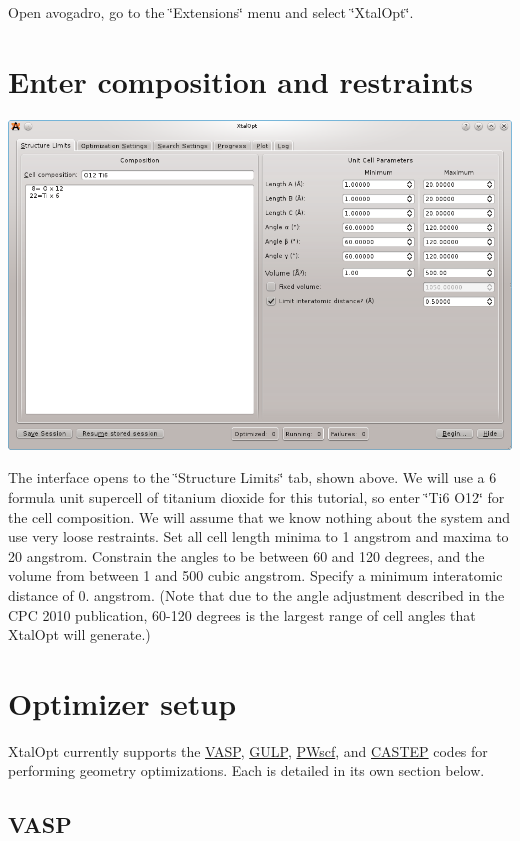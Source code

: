Open avogadro, go to the \char`\"{}\+Extensions\char`\"{} menu and select \char`\"{}\+Xtal\+Opt\char`\"{}.\hypertarget{tut-xo_init}{}\section{Enter composition and restraints}\label{tut-xo_init}
 
\begin{DoxyImageNoCaption}
  \mbox{\includegraphics[width=\textwidth]{struct-lim.png}}
\end{DoxyImageNoCaption}


The interface opens to the \char`\"{}\+Structure Limits\char`\"{} tab, shown above. We will use a 6 formula unit supercell of titanium dioxide for this tutorial, so enter \char`\"{}\+Ti6 O12\char`\"{} for the cell composition. We will assume that we know nothing about the system and use very loose restraints. Set all cell length minima to 1 angstrom and maxima to 20 angstrom. Constrain the angles to be between 60 and 120 degrees, and the volume from between 1 and 500 cubic angstrom. Specify a minimum interatomic distance of 0. angstrom. (Note that due to the angle adjustment described in the C\+P\+C 2010 publication, 60-\/120 degrees is the largest range of cell angles that Xtal\+Opt will generate.)\hypertarget{tut-xo_opt}{}\section{Optimizer setup}\label{tut-xo_opt}
Xtal\+Opt currently supports the \hyperlink{tut-xo_vasp-opt}{V\+A\+S\+P}, \hyperlink{tut-xo_gulp-opt}{G\+U\+L\+P}, \hyperlink{tut-xo_pwscf-opt}{P\+Wscf}, and \hyperlink{tut-xo_castep-opt}{C\+A\+S\+T\+E\+P} codes for performing geometry optimizations. Each is detailed in its own section below.\hypertarget{tut-xo_vasp-opt}{}\subsection{V\+A\+S\+P}\label{tut-xo_vasp-opt}
 
